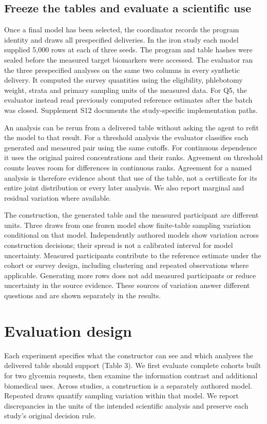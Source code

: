 \documentclass[11pt,letterpaper]{article}
\begin{document}
\subsection{Freeze the tables and evaluate a scientific use}

Once a final model has been selected, the coordinator records the program identity and draws all prespecified deliveries. In the iron study each model supplied 5,000 rows at each of three seeds. The program and table hashes were sealed before the measured target biomarkers were accessed. The evaluator ran the three prespecified analyses on the same two columns in every synthetic delivery. It computed the survey quantities using the eligibility, phlebotomy weight, strata and primary sampling units of the measured data. For Q5, the evaluator instead read previously computed reference estimates after the batch was closed. Supplement S12 documents the study-specific implementation paths.


An analysis can be rerun from a delivered table without asking the agent to refit the model to that result. For a threshold analysis the evaluator classifies each generated and measured pair using the same cutoffs. For continuous dependence it uses the original paired concentrations and their ranks. Agreement on threshold counts leaves room for differences in continuous ranks. Agreement for a named analysis is therefore evidence about that use of the table, not a certificate for its entire joint distribution or every later analysis. We also report marginal and residual variation where available.


The construction, the generated table and the measured participant are different units. Three draws from one frozen model show finite-table sampling variation conditional on that model. Independently authored models show variation across construction decisions; their spread is not a calibrated interval for model uncertainty. Measured participants contribute to the reference estimate under the cohort or survey design, including clustering and repeated observations where applicable. Generating more rows does not add measured participants or reduce uncertainty in the source evidence. These sources of variation answer different questions and are shown separately in the results.


\section{Evaluation design}

Each experiment specifies what the constructor can see and which analyses the delivered table should support (Table 3). We first evaluate complete cohorts built for two glycemia requests, then examine the information contrast and additional biomedical uses. Across studies, a construction is a separately authored model. Repeated draws quantify sampling variation within that model. We report discrepancies in the units of the intended scientific analysis and preserve each study's original decision rule.
\end{document}
